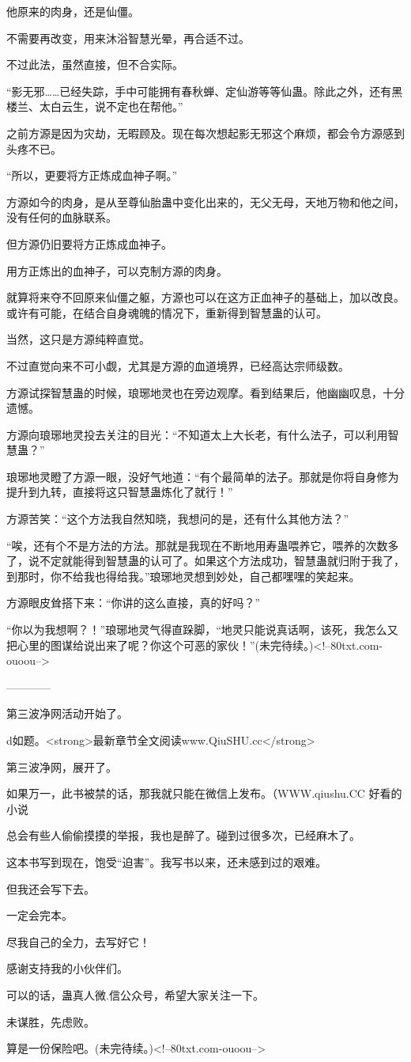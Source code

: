 \begin{this_body}
他原来的肉身，还是仙僵。

不需要再改变，用来沐浴智慧光晕，再合适不过。

不过此法，虽然直接，但不合实际。

“影无邪……已经失踪，手中可能拥有春秋蝉、定仙游等等仙蛊。除此之外，还有黑楼兰、太白云生，说不定也在帮他。”

之前方源是因为灾劫，无暇顾及。现在每次想起影无邪这个麻烦，都会令方源感到头疼不已。

“所以，更要将方正炼成血神子啊。”

方源如今的肉身，是从至尊仙胎蛊中变化出来的，无父无母，天地万物和他之间，没有任何的血脉联系。

但方源仍旧要将方正炼成血神子。

用方正炼出的血神子，可以克制方源的肉身。

就算将来夺不回原来仙僵之躯，方源也可以在这方正血神子的基础上，加以改良。或许有可能，在结合自身魂魄的情况下，重新得到智慧蛊的认可。

当然，这只是方源纯粹直觉。

不过直觉向来不可小觑，尤其是方源的血道境界，已经高达宗师级数。

方源试探智慧蛊的时候，琅琊地灵也在旁边观摩。看到结果后，他幽幽叹息，十分遗憾。

方源向琅琊地灵投去关注的目光：“不知道太上大长老，有什么法子，可以利用智慧蛊？”

琅琊地灵瞪了方源一眼，没好气地道：“有个最简单的法子。那就是你将自身修为提升到九转，直接将这只智慧蛊炼化了就行！”

方源苦笑：“这个方法我自然知晓，我想问的是，还有什么其他方法？”

“唉，还有个不是方法的方法。那就是我现在不断地用寿蛊喂养它，喂养的次数多了，说不定就能得到智慧蛊的认可了。如果这个方法成功，智慧蛊就归附于我了，到那时，你不给我也得给我。”琅琊地灵想到妙处，自己都嘿嘿的笑起来。

方源眼皮耸搭下来：“你讲的这么直接，真的好吗？”

“你以为我想啊？！”琅琊地灵气得直跺脚，“地灵只能说真话啊，该死，我怎么又把心里的图谋给说出来了呢？你这个可恶的家伙！”(未完待续。)<!--80txt.com-ouoou-->

------------

第三波净网活动开始了。

d如题。<strong>最新章节全文阅读www.QiuSHU.cc</strong>

第三波净网，展开了。

如果万一，此书被禁的话，那我就只能在微信上发布。（WWW.qiushu.CC 好看的小说

总会有些人偷偷摸摸的举报，我也是醉了。碰到过很多次，已经麻木了。

这本书写到现在，饱受“迫害”。我写书以来，还未感到过的艰难。

但我还会写下去。

一定会完本。

尽我自己的全力，去写好它！

感谢支持我的小伙伴们。

可以的话，蛊真人微.信公众号，希望大家关注一下。

未谋胜，先虑败。

算是一份保险吧。(未完待续。)<!--80txt.com-ouoou-->

\end{this_body}

